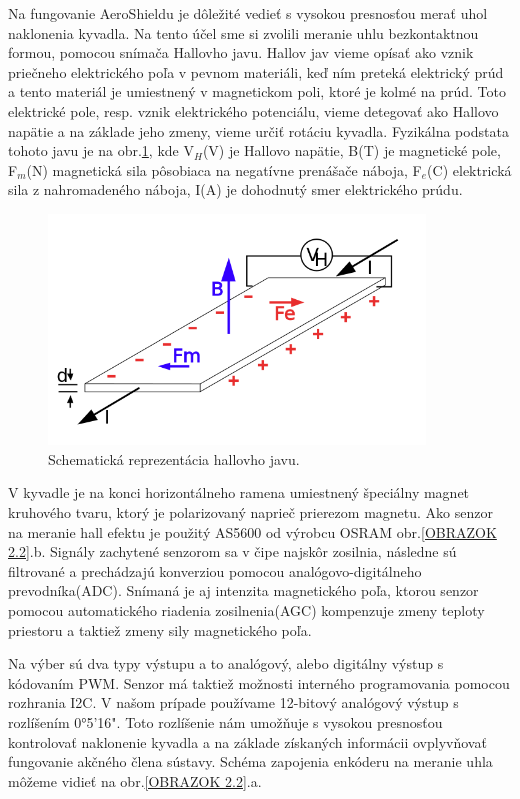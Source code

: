 Na fungovanie AeroShieldu je dôležité vedieť s vysokou presnosťou merať uhol naklonenia kyvadla. Na tento účel sme si zvolili meranie uhlu bezkontaktnou formou, pomocou snímača Hallovho javu. Hallov jav vieme opísať ako vznik priečneho elektrického poľa v pevnom materiáli, keď ním preteká elektrický prúd a tento materiál je umiestnený v magnetickom poli, ktoré je kolmé na prúd\cite{Hall}. Toto elektrické pole, resp. vznik elektrického potenciálu, vieme detegovať ako Hallovo napätie a na základe jeho zmeny, vieme určiť rotáciu kyvadla. Fyzikálna podstata tohoto javu je na obr.\ref{OBRAZOK 1.323}, kde V$_H$(V) je Hallovo napätie, B(T) je magnetické pole, F$_m$(N) magnetická sila pôsobiaca na negatívne prenášače náboja, F$_e$(C) elektrická sila z nahromadeného náboja, I(A) je dohodnutý smer elektrického prúdu. 

\begin{figure}[!tbh]
	\centering
	\includegraphics[width=100mm]{obr/hallovjav.png}
	\caption{Schematická reprezentácia hallovho javu.}\label{OBRAZOK 1.323}
\end{figure}

V kyvadle je na konci horizontálneho ramena umiestnený špeciálny magnet kruhového tvaru, ktorý je polarizovaný naprieč prierezom magnetu. Ako senzor na meranie hall efektu je použitý AS5600 od výrobcu OSRAM obr.\ref{OBRAZOK 2.2}.b. Signály zachytené senzorom sa v čipe najskôr zosilnia, následne sú filtrované a prechádzajú konverziou pomocou analógovo-digitálneho prevodníka(ADC). Snímaná je aj intenzita magnetického poľa, ktorou senzor pomocou
automatického riadenia zosilnenia(AGC) kompenzuje zmeny teploty priestoru a taktiež zmeny sily magnetického poľa.

Na výber sú dva typy výstupu a to analógový, alebo digitálny výstup s kódovaním PWM. Senzor má taktiež možnosti interného programovania pomocou rozhrania I2C.
V našom prípade používame 12-bitový analógový výstup s rozlíšením 0°5'16". Toto rozlíšenie nám umožňuje s vysokou presnosťou kontrolovať naklonenie kyvadla a na základe získaných informácii ovplyvňovať fungovanie akčného člena sústavy. Schéma zapojenia enkóderu na meranie uhla môžeme vidieť na obr.\ref{OBRAZOK 2.2}.a.



